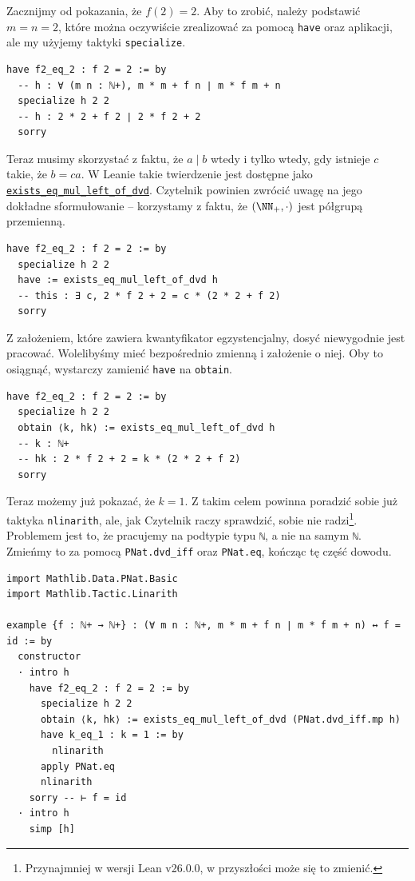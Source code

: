 \documentclass[polish,pretty,bibliography=totocnumbered]{angav}
\newcommand{\Lean}[1]{\texttt{#1}}
\begin{document}
Zacznijmy od pokazania, że $f(2) = 2$. Aby to zrobić, należy podstawić $m = n = 2$, które można oczywiście zrealizować za pomocą \Lean{have} oraz aplikacji, ale my użyjemy taktyki \Lean{specialize}.
\begin{verbatim}
have f2_eq_2 : f 2 = 2 := by
  -- h : ∀ (m n : ℕ+), m * m + f n ∣ m * f m + n
  specialize h 2 2
  -- h : 2 * 2 + f 2 ∣ 2 * f 2 + 2
  sorry
\end{verbatim}

Teraz musimy skorzystać z faktu, że $a \mid b$ wtedy i tylko wtedy, gdy istnieje $c$ takie, że $b = ca$. W Leanie takie twierdzenie jest dostępne jako \href{https://leanprover-community.github.io/mathlib4_docs/Mathlib/Algebra/Divisibility/Basic.html#exists_eq_mul_left_of_dvd}{\Lean{exists_eq_mul_left_of_dvd}}.
Czytelnik powinien zwrócić uwagę na jego dokładne sformułowanie -- korzystamy z faktu, że $(\NN_+, \cdot)$ jest półgrupą przemienną.
\begin{verbatim}
have f2_eq_2 : f 2 = 2 := by
  specialize h 2 2
  have := exists_eq_mul_left_of_dvd h
  -- this : ∃ c, 2 * f 2 + 2 = c * (2 * 2 + f 2)
  sorry
\end{verbatim}
Z założeniem, które zawiera kwantyfikator egzystencjalny, dosyć niewygodnie jest pracować. Wolelibyśmy mieć bezpośrednio zmienną i założenie o niej. Oby to osiągnąć, wystarczy zamienić \Lean{have} na \Lean{obtain}.
\begin{verbatim}
have f2_eq_2 : f 2 = 2 := by
  specialize h 2 2
  obtain ⟨k, hk⟩ := exists_eq_mul_left_of_dvd h
  -- k : ℕ+
  -- hk : 2 * f 2 + 2 = k * (2 * 2 + f 2)
  sorry
\end{verbatim}

Teraz możemy już pokazać, że $k = 1$. Z takim celem powinna poradzić sobie już taktyka \Lean{nlinarith}, ale, jak Czytelnik raczy sprawdzić, sobie nie radzi\footnote{Przynajmniej w wersji Lean v26.0.0, w przyszłości może się to zmienić.}. Problemem jest to, że pracujemy na podtypie typu \Lean{ℕ}, a nie na samym \Lean{ℕ}. Zmieńmy to za pomocą \Lean{PNat.dvd_iff} oraz \Lean{PNat.eq}, kończąc tę część dowodu.
\begin{verbatim}
import Mathlib.Data.PNat.Basic
import Mathlib.Tactic.Linarith

example {f : ℕ+ → ℕ+} : (∀ m n : ℕ+, m * m + f n ∣ m * f m + n) ↔ f = id := by
  constructor
  · intro h
    have f2_eq_2 : f 2 = 2 := by
      specialize h 2 2
      obtain ⟨k, hk⟩ := exists_eq_mul_left_of_dvd (PNat.dvd_iff.mp h)
      have k_eq_1 : k = 1 := by
        nlinarith
      apply PNat.eq
      nlinarith
    sorry -- ⊢ f = id
  · intro h
    simp [h]
\end{verbatim}
\end{document}
